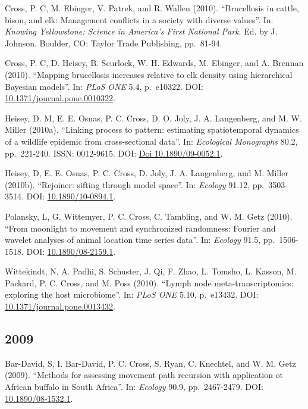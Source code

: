 \documentclass[12pt,]{article}
\begin{document}
Cross, P. C, M. Ebinger, V. Patrek, and R. Wallen (2010). ``Brucellosis
in cattle, bison, and elk: Management conflicts in a society with
diverse values''. In: \emph{Knowing Yellowstone: Science in America's
First National Park}. Ed. by J. Johnson. Boulder, CO: Taylor Trade
Publishing, pp.~81-94.

Cross, P. C, D. Heisey, B. Scurlock, W. H. Edwards, M. Ebinger, and A.
Brennan (2010). ``Mapping brucellosis increases relative to elk density
using hierarchical Bayesian models''. In: \emph{PLoS ONE} 5.4,
p.~e10322. DOI:
\href{https://doi.org/10.1371\%2Fjournal.pone.0010322}{10.1371/journal.pone.0010322}.

Heisey, D. M, E. E. Osnas, P. C. Cross, D. O. Joly, J. A. Langenberg,
and M. W. Miller (2010a). ``Linking process to pattern: estimating
spatiotemporal dynamics of a wildlife epidemic from cross-sectional
data''. In: \emph{Ecological Monographs} 80.2, pp.~221-240. ISSN:
0012-9615. DOI: \href{https://doi.org/Doi\%2010.1890\%2F09-0052.1}{Doi
10.1890/09-0052.1}.

Heisey, D, E. E. Osnas, P. C. Cross, D. Joly, J. A. Langenberg, and M.
Miller (2010b). ``Rejoiner: sifting through model space''. In:
\emph{Ecology} 91.12, pp.~3503-3514. DOI:
\href{https://doi.org/10.1890\%2F10-0894.1}{10.1890/10-0894.1}.

Polansky, L, G. Wittemyer, P. C. Cross, C. Tambling, and W. M. Getz
(2010). ``From moonlight to movement and synchronized randomness:
Fourier and wavelet analyses of animal location time series data''. In:
\emph{Ecology} 91.5, pp.~1506-1518. DOI:
\href{https://doi.org/10.1890\%2F08-2159.1}{10.1890/08-2159.1}.

Wittekindt, N, A. Padhi, S. Schuster, J. Qi, F. Zhao, L. Tomsho, L.
Kasson, M. Packard, P. C. Cross, and M. Poss (2010). ``Lymph node
meta-transcriptomics: exploring the host microbiome''. In: \emph{PLoS
ONE} 5.10, p.~e13432. DOI:
\href{https://doi.org/10.1371\%2Fjournal.pone.0013432}{10.1371/journal.pone.0013432}.

\hypertarget{section-10}{%
\subsection{2009}\label{section-10}}

Bar-David, S, I. Bar-David, P. C. Cross, S. Ryan, C. Knechtel, and W. M.
Getz (2009). ``Methods for assessing movement path recursion with
application ot African buffalo in South Africa''. In: \emph{Ecology}
90.9, pp.~2467-2479. DOI:
\href{https://doi.org/10.1890\%2F08-1532.1}{10.1890/08-1532.1}.
\end{document}
